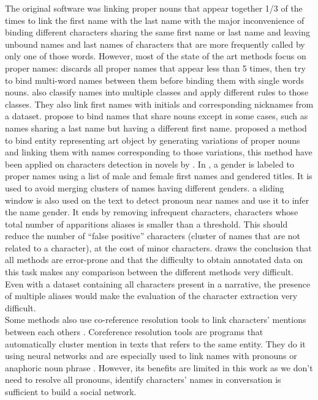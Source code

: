 \documentclass[a4paper, 12pt]{report}
\begin{document}
The original software \citep{original} was linking proper nouns that appear together 1/3 of the times to link the first name with the last name with the major inconvenience of binding different characters sharing the same first name or last name and leaving unbound names and last names of characters that are more frequently called by only one of those words.
However, most of the state of the art methods focus on proper names:
\cite{delete5} discards all proper names that appear less than 5 times, then try to bind multi-word names between them before binding them with single words nouns.
\cite{structure_clustering} also classify names into multiple classes and apply different rules to those classes.
They also link first names with initials and corresponding nicknames from a dataset.
\cite{character_meta} propose to bind names that share nouns except in some cases, such as names sharing a last name but having a different first name.
\cite{variation} proposed a method to bind entity representing art object by generating variations of proper nouns and linking them with names corresponding to those variations,
this method have been applied on characters detection in novels by \cite{quoted, character_meta}.
In \cite{delete5, structure_clustering, quoted}, a gender is labeled to proper names using a list of male and female first names and gendered titles.
It is used to avoid merging clusters of names having different genders.
\cite{ structure_clustering} a sliding window is also used on the text to detect pronoun near names and use it to infer the name gender.
It ends by removing infrequent characters, characters whose total number of apparitions aliases is smaller than a threshold.
This should reduce the number of ``false positive'' characters (cluster of names that are not related to a character), at the cost of minor characters.
\cite{delete5} draws the conclusion that all methods are error-prone and that the difficulty to obtain annotated data on this task makes any comparison
between the different methods very difficult.
Even with a dataset containing all characters present in a narrative, the presence of multiple aliases would make the evaluation of the character extraction very difficult.\\

Some methods also use co-reference resolution tools to link characters' mentions between each others \citep{character_meta}.
Coreference resolution tools are programs that automatically cluster mention in texts that refers to the same entity.
They do it using neural networks and are especially used to link names with pronouns or anaphoric noun phrase \citep{coref_deep, coref_deep2}.
However, its benefits are limited in this work as we don't need to resolve all pronouns, identify characters' names in conversation is sufficient to build a social network.\\
\end{document}
